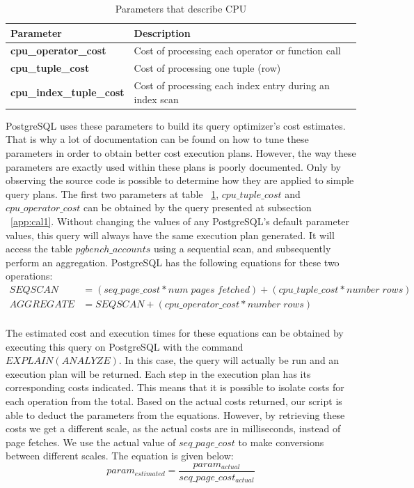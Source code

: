 \documentclass[jidm,a4paper]{jidm} %
\begin{document}
\begin{table}[t]
    \centering
    \caption{Parameters that describe CPU}
    \label{table:descriptive}
    \sffamily


    \begin{tabular}{ | l | p{5cm} |}
    \hline
    Parameter & Description  \\ \hline
    \textbf{cpu\_operator\_cost} & Cost of processing each operator or function call \\ \hline
    \textbf{cpu\_tuple\_cost} & Cost of processing one tuple (row) \\ \hline
    \textbf{cpu\_index\_tuple\_cost} & Cost of processing each index entry during an index scan  \\
    \hline
    \end{tabular}
    \rmfamily

\end{table}


PostgreSQL uses these parameters to build its query optimizer's cost estimates. That is why a lot of documentation can be found on how to tune these parameters in order to obtain better cost execution plans. However, the way these parameters are exactly used within these plans is poorly documented. Only by observing the source code is possible to determine how they are applied to simple query plans. The first two parameters at table ~\ref{table:descriptive}, $cpu\_tuple\_cost$ and $cpu\_operator\_cost$ can be obtained by the query presented at subsection ~\ref{app:cal1}. Without changing the values of any PostgreSQL's default parameter values, this query will always have the same execution plan generated. It will access the table $pgbench\_accounts$ using a sequential scan, and subsequently perform an aggregation. PostgreSQL has the following equations for these two operations:
\begin{equation}
  \begin{split}
      SEQSCAN &= ( seq\_page\_cost * num\; pages \; fetched ) + ( cpu\_tuple\_cost * number\; rows ) \\
      AGGREGATE &= SEQSCAN + ( cpu\_operator\_cost * number\; rows) \\
  \end{split}
\end{equation}

The estimated cost and execution times for these equations can be obtained by executing this query on PostgreSQL with the command $EXPLAIN (ANALYZE)$. In this case, the query will actually be run and an execution plan will be returned. Each step in the execution plan has its corresponding costs indicated. This means that it is possible to isolate costs for each operation from the total. Based on the actual costs returned, our script is able to deduct the parameters from the equations. However, by retrieving these costs we get a different scale, as the actual costs are in milliseconds, instead of page fetches. We use the actual value of $seq\_page\_cost$ to make conversions between different scales. The equation is given below:
\[
 param_{estimated} = \frac{param_{actual}}{seq\_page\_cost_{actual}}
\]
\end{document}
